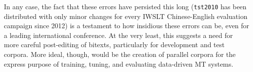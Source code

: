 In any case, the fact that these errors have persisted this long ({\small \tt tst2010} has been distributed with only minor changes for every IWSLT Chinese-English evaluation campaign since 2012) is a testament to how insidious these errors can be, even for a leading international conference. 
At the very least, this suggests a need for more careful post-editing of bitexts, particularly for development and test corpora.
More ideal, though, would be the creation of parallel corpora for the express purpose of training, tuning, and evaluating data-driven MT systems.










